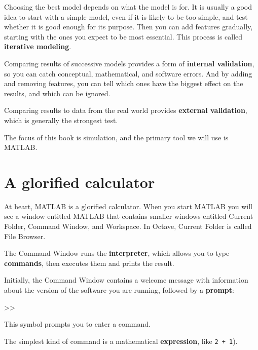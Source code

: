 \documentclass[
]{book}
\numberwithin{Answer}{chapter}
\numberwithin{Exercise}{chapter}
\begin{document}
Choosing the best model depends on what the model is for.  It is usually a good idea to start with a simple model, even if it is likely to be too simple, and test whether it is good enough for its purpose.  Then you can add features gradually, starting with the ones you expect to be most essential.  This process is called {\bf iterative modeling}.


Comparing results of successive models provides a form of {\bf internal validation}, so you can catch conceptual, mathematical, and software errors.  And by adding and removing features, you can tell which ones have the biggest effect on the results, and which can be ignored.


Comparing results to data from the real world provides {\bf external validation}, which is generally the strongest test.

The focus of this book is simulation, and the primary tool we will use is MATLAB.


\section{A glorified calculator}
\label{sect:calc}

At heart, MATLAB is a glorified calculator.  When you start MATLAB
you will see a window
entitled {\sf MATLAB} that contains smaller windows entitled {\sf
Current Folder}, {\sf Command Window}, and {\sf Workspace}.
In Octave, {\sf Current Folder} is called {\sf File Browser}.


The Command Window runs the {\bf interpreter}, which allows you
to type {\bf commands}, then executes them and prints the
result.


Initially, the Command Window contains a welcome message with information
about the version of the software you are running, followed by a {\bf prompt}:

\begin{code}
>>
\end{code}

This symbol prompts you to enter a command.

The simplest kind of command is a mathematical {\bf expression},
like {\tt 2 + 1}).
\end{document}
